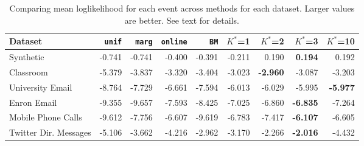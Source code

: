 \begin{table*}[t]
\begin{center}
{\footnotesize
\begin{tabular}{lrrrrrrrr}
  \hline
Dataset & \texttt{unif} & \texttt{marg} & \texttt{online} & \texttt{BM} & $K^*$=1 & $K^*$=2 & $K^*$=3 & $K^*$=10 \\ 
  \hline
Synthetic & -0.741 & -0.741 & -0.400 & -0.391 & -0.211 & 0.190 & \textbf{0.194} & 0.192 \\ 
  Classroom & -5.379 & -3.837 & -3.320 & -3.404 & -3.023 & \textbf{-2.960} & -3.087 & -3.203 \\ 
  University Email & -8.764 & -7.729 & -6.661 & -7.594 & -6.013 & -6.029 & -5.995 & \textbf{-5.977} \\ 
  Enron Email & -9.355 & -9.657 & -7.593 & -8.425 & -7.025 & -6.860 & \textbf{-6.835} & -7.264 \\ 
  Mobile Phone Calls & -9.612 & -7.756 & -6.607 & -9.619 & -6.783 & -7.417 & \textbf{-6.107} & -6.605 \\ 
  Twitter Dir. Messages & -5.106 & -3.662 & -4.216 & -2.962 & -3.170 & -2.266 & \textbf{-2.016} & -4.432 \\ 
   \hline
\end{tabular}
}
\caption{Comparing mean loglikelihood for each event across methods for each dataset.  Larger values are better.  See text for details.}
\label{tab:results}
\end{center}
\end{table*}
